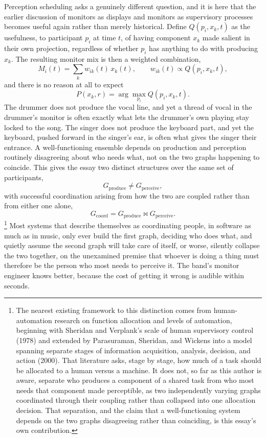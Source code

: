 \documentclass[12pt]{article}
\begin{document}
Perception scheduling asks a genuinely different question, and it is here that the earlier discussion of monitors as displays and monitors as supervisory processes becomes useful again rather than merely historical. Define $Q(p_i, x_k, t)$ as the usefulness, to participant $p_i$ at time $t$, of having component $x_k$ made salient in their own projection, regardless of whether $p_i$ has anything to do with producing $x_k$. The resulting monitor mix is then a weighted combination,
\[
M_i(t) = \sum_k w_{ik}(t) \, x_k(t), \qquad w_{ik}(t) \propto Q(p_i, x_k, t),
\]
and there is no reason at all to expect
\[
P(x_k, r) = \arg\max_{p_i} Q(p_i, x_k, t).
\]
The drummer does not produce the vocal line, and yet a thread of vocal in the drummer's monitor is often exactly what lets the drummer's own playing stay locked to the song. The singer does not produce the keyboard part, and yet the keyboard, pushed forward in the singer's ear, is often what gives the singer their entrance. A well-functioning ensemble depends on production and perception routinely disagreeing about who needs what, not on the two graphs happening to coincide. This gives the essay two distinct structures over the same set of participants,
\[
G_{\mathrm{produce}} \neq G_{\mathrm{perceive}},
\]
with successful coordination arising from how the two are coupled rather than from either one alone,
\[
G_{\mathrm{coord}} = G_{\mathrm{produce}} \bowtie G_{\mathrm{perceive}}.
\]\footnote{The nearest existing framework to this distinction comes from human-automation research on function allocation and levels of automation, beginning with Sheridan and Verplank's scale of human supervisory control (1978) and extended by Parasuraman, Sheridan, and Wickens into a model spanning separate stages of information acquisition, analysis, decision, and action (2000). That literature asks, stage by stage, how much of a task should be allocated to a human versus a machine. It does not, so far as this author is aware, separate who produces a component of a shared task from who most needs that component made perceptible, as two independently varying graphs coordinated through their coupling rather than collapsed into one allocation decision. That separation, and the claim that a well-functioning system depends on the two graphs disagreeing rather than coinciding, is this essay's own contribution.}
Most systems that describe themselves as coordinating people, in software as much as in music, only ever build the first graph, deciding who does what, and quietly assume the second graph will take care of itself, or worse, silently collapse the two together, on the unexamined premise that whoever is doing a thing must therefore be the person who most needs to perceive it. The band's monitor engineer knows better, because the cost of getting it wrong is audible within seconds.
\end{document}
